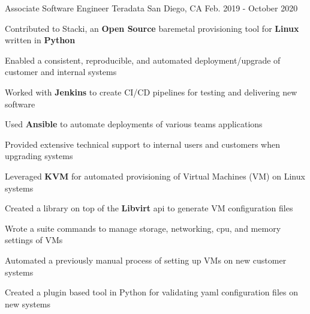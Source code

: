 

\begin{cventries}

  \cventry
    {Associate Software Engineer} %
    {Teradata} %
    {San Diego, CA} %
    {Feb. 2019 - October 2020} %
    {
      \begin{cvitems} %
        \item{ Contributed to Stacki, an \textbf{Open Source} baremetal provisioning tool for \textbf{Linux} written in \textbf{Python} }
        \item{ Enabled a consistent, reproducible, and automated deployment/upgrade of customer and internal systems }
        \item{ Worked with \textbf{Jenkins} to create CI/CD pipelines for testing and delivering new software }
        \item{ Used \textbf{Ansible} to automate deployments of various teams applications }
        \item{ Provided extensive technical support to internal users and customers when upgrading systems } 
        \item{ Leveraged \textbf{KVM} for automated provisioning of Virtual Machines (VM) on Linux systems }
        \item{ Created a library on top of the \textbf{Libvirt} api to generate VM configuration files }
        \item{ Wrote a suite commands to manage storage, networking, cpu, and memory settings of VMs }
        \item{ Automated a previously manual process of setting up VMs on new customer systems }
        \item{ Created a plugin based tool in Python for validating yaml configuration files on new systems }
      \end{cvitems}
    }


\end{cventries}
